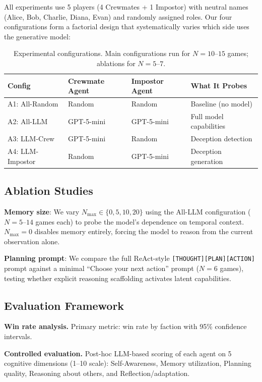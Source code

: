 \documentclass{article}
\begin{document}
All experiments use 5 players (4 Crewmates + 1 Impostor) with neutral names (Alice, Bob, Charlie, Diana, Evan) and randomly assigned roles. Our four configurations form a factorial design that systematically varies which side uses the generative model:

\begin{table}[h]
\centering
\caption{Experimental configurations. Main configurations run for $N=10$--$15$ games; ablations for $N=5$--$7$.}
\label{tab:configs}
\begin{tabular}{llll}
\toprule
Config & Crewmate Agent & Impostor Agent & What It Probes \\
\midrule
A1: All-Random & Random & Random & Baseline (no model) \\
A2: All-LLM & GPT-5-mini & GPT-5-mini & Full model capabilities \\
A3: LLM-Crew & GPT-5-mini & Random & Deception detection \\
A4: LLM-Impostor & Random & GPT-5-mini & Deception generation \\
\bottomrule
\end{tabular}
\end{table}

\subsection{Ablation Studies}

\textbf{Memory size}: We vary $N_{\max} \in \{0, 5, 10, 20\}$ using the All-LLM configuration ($N=5$--$14$ games each) to probe the model's dependence on temporal context. $N_{\max}=0$ disables memory entirely, forcing the model to reason from the current observation alone.

\textbf{Planning prompt}: We compare the full ReAct-style \texttt{[THOUGHT][PLAN][ACTION]} prompt against a minimal ``Choose your next action'' prompt ($N=6$ games), testing whether explicit reasoning scaffolding activates latent capabilities.

\subsection{Evaluation Framework}

\textbf{Win rate analysis.} Primary metric: win rate by faction with 95\% confidence intervals.

\textbf{Controlled evaluation.} Post-hoc LLM-based scoring of each agent on 5 cognitive dimensions (1--10 scale): Self-Awareness, Memory utilization, Planning quality, Reasoning about others, and Reflection/adaptation.
\end{document}
